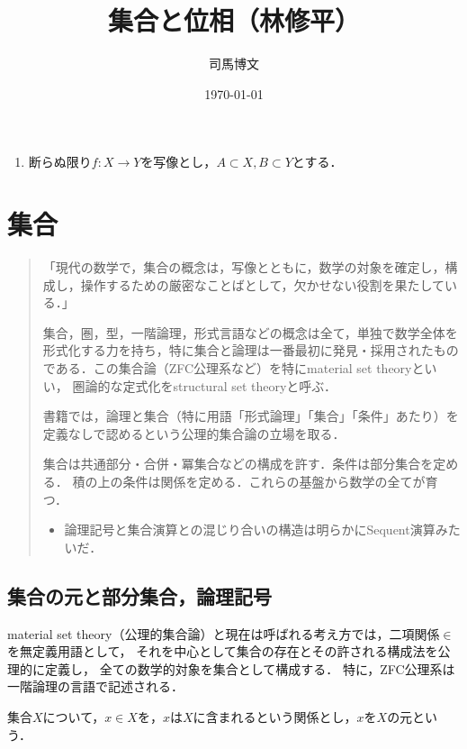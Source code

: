 \documentclass[uplatex, 12pt, dvipdfmx]{jsreport}
\title{集合と位相（林修平）}
\author{司馬博文}
\date{\today}
\begin{document}
\tableofcontents

\begin{notation*}\mbox{}
    \begin{enumerate}
        \item 断らぬ限り$f:X\to Y$を写像とし，$A\subset X,B\subset Y$とする．
    \end{enumerate}
\end{notation*}

\chapter{集合}

\begin{quotation}
    「現代の数学で，集合の概念は，写像とともに，数学の対象を確定し，構成し，操作するための厳密なことばとして，欠かせない役割を果たしている．」\cite{斎藤毅}

    集合，圏，型，一階論理，形式言語などの概念は全て，単独で数学全体を形式化する力を持ち，特に集合と論理は一番最初に発見・採用されたものである．この集合論（ZFC公理系など）を特にmaterial set theoryといい，
    圏論的な定式化をstructural set theoryと呼ぶ．

    書籍\cite{斎藤毅}では，論理と集合（特に用語「形式論理」「集合」「条件」あたり）を定義なしで認めるという公理的集合論の立場を取る．

    集合は共通部分・合併・冪集合などの構成を許す．条件は部分集合を定める．
    積の上の条件は関係を定める．これらの基盤から数学の全てが育つ．

    \begin{itemize}
        \item 論理記号と集合演算との混じり合いの構造は明らかにSequent演算みたいだ．
    \end{itemize}
\end{quotation}

\section{集合の元と部分集合，論理記号}

\begin{screen}
    material set theory（公理的集合論）と現在は呼ばれる考え方では，二項関係$\in$を無定義用語として，
    それを中心として集合の存在とその許される構成法を公理的に定義し，
    全ての数学的対象を集合として構成する．
    特に，ZFC公理系は一階論理の言語で記述される．
\end{screen}

\begin{axiom}[二項関係$\in$]
    集合$X$について，$x\in X$を，$x$は$X$に含まれるという関係とし，$x$を$X$の元という．
\end{axiom}
\end{document}
